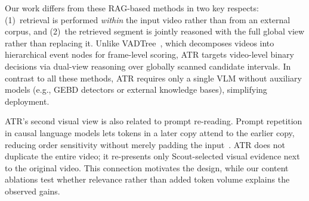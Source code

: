 Our work differs from these RAG-based methods in two key respects: (1)~retrieval is performed \emph{within} the input video rather than from an external corpus, and (2)~the retrieved segment is jointly reasoned with the full global view rather than replacing it. Unlike VADTree~\cite{li2025vadtree}, which decomposes videos into hierarchical event nodes for frame-level scoring, ATR targets video-level binary decisions via dual-view reasoning over globally scanned candidate intervals. In contrast to all these methods, ATR requires only a single VLM without auxiliary models (e.g., GEBD detectors or external knowledge bases), simplifying deployment.

ATR's second visual view is also related to prompt re-reading. Prompt repetition in causal language models lets tokens in a later copy attend to the earlier copy, reducing order sensitivity without merely padding the input~\cite{leviathan2025prompt}. ATR does not duplicate the entire video; it re-presents only Scout-selected visual evidence next to the original video. This connection motivates the design, while our content ablations test whether relevance rather than added token volume explains the observed gains.
